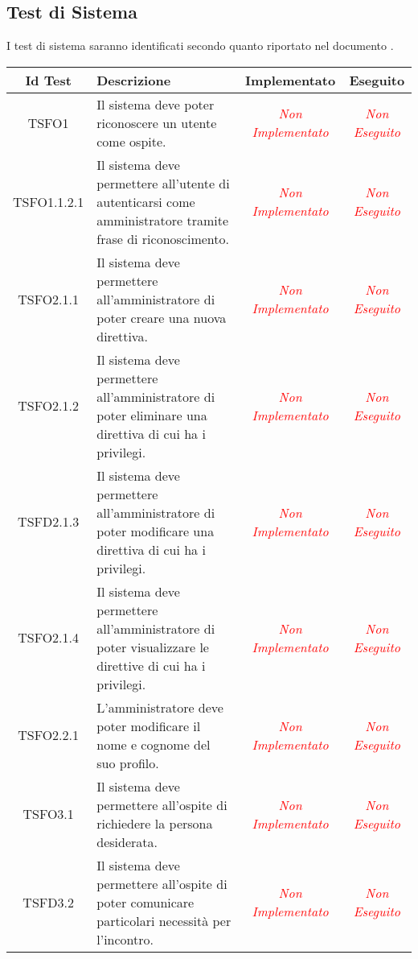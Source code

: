 \subsection{Test di Sistema}
I test di sistema saranno identificati secondo quanto riportato nel documento \NPdoc{}.
\normalsize
\begin{longtable}{|c|>{}m{8cm}|c|c|}
\hline
\textbf{Id Test} & \textbf{Descrizione} & \textbf{Implementato} & \textbf{Eseguito}\\
\hline
\endhead
\hypertarget{TSFO1}{TSFO1} & Il sistema deve poter riconoscere un utente come ospite. & \textcolor{red}{\textit{Non Implementato}} & \textcolor{red}{\textit{Non Eseguito}}\\ \hline
\hypertarget{TSFO1.1.2.1}{TSFO1.1.2.1} & Il sistema deve permettere all'utente di autenticarsi come amministratore tramite frase di riconoscimento. & \textcolor{red}{\textit{Non Implementato}} & \textcolor{red}{\textit{Non Eseguito}}\\ \hline
\hypertarget{TSFO2.1.1}{TSFO2.1.1} & Il sistema deve permettere all'amministratore di poter creare una nuova direttiva. & \textcolor{red}{\textit{Non Implementato}} & \textcolor{red}{\textit{Non Eseguito}}\\ \hline
\hypertarget{TSFO2.1.2}{TSFO2.1.2} & Il sistema deve permettere all'amministratore di poter eliminare una direttiva di cui ha i privilegi. & \textcolor{red}{\textit{Non Implementato}} & \textcolor{red}{\textit{Non Eseguito}}\\ \hline
\hypertarget{TSFD2.1.3}{TSFD2.1.3} & Il sistema deve permettere all'amministratore di poter modificare una direttiva di cui ha i privilegi. & \textcolor{red}{\textit{Non Implementato}} & \textcolor{red}{\textit{Non Eseguito}}\\ \hline
\hypertarget{TSFO2.1.4}{TSFO2.1.4} & Il sistema deve permettere all'amministratore di poter visualizzare le direttive di cui ha i privilegi. & \textcolor{red}{\textit{Non Implementato}} & \textcolor{red}{\textit{Non Eseguito}}\\ \hline
\hypertarget{TSFO2.2.1}{TSFO2.2.1} & L'amministratore deve poter modificare il nome e cognome del suo profilo. & \textcolor{red}{\textit{Non Implementato}} & \textcolor{red}{\textit{Non Eseguito}}\\ \hline
\hypertarget{TSFO3.1}{TSFO3.1} & Il sistema deve permettere all'ospite di richiedere la persona desiderata. & \textcolor{red}{\textit{Non Implementato}} & \textcolor{red}{\textit{Non Eseguito}}\\ \hline
\hypertarget{TSFD3.2}{TSFD3.2} & Il sistema deve permettere all'ospite di poter comunicare particolari necessità per l'incontro. & \textcolor{red}{\textit{Non Implementato}} & \textcolor{red}{\textit{Non Eseguito}}\\ \hline

\end{longtable}
